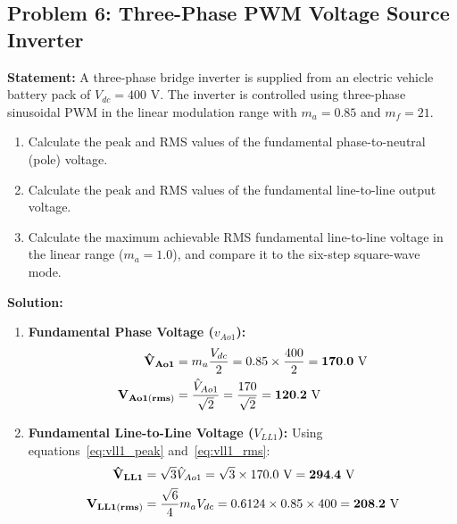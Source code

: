 \documentclass[11pt,a4paper]{article}
\let\origsubsection\subsection
\renewcommand{\subsection}{\Needspace{7\baselineskip}\origsubsection}
\begin{document}
\subsection{Problem 6: Three-Phase PWM Voltage Source Inverter}
\begin{examplebox}
\textbf{Statement:} A three-phase bridge inverter is supplied from an electric vehicle battery pack of $V_{dc} = 400\text{ V}$. The inverter is controlled using three-phase sinusoidal PWM in the linear modulation range with $m_a = 0.85$ and $m_f = 21$.
\begin{enumerate}
  \item Calculate the peak and RMS values of the fundamental phase-to-neutral (pole) voltage.
  \item Calculate the peak and RMS values of the fundamental line-to-line output voltage.
  \item Calculate the maximum achievable RMS fundamental line-to-line voltage in the linear range ($m_a = 1.0$), and compare it to the six-step square-wave mode.
\end{enumerate}

\tcblower
\textbf{Solution:}
\begin{enumerate}
  \item \textbf{Fundamental Phase Voltage ($v_{Ao1}$):}
  \begin{align*}
  \mathbf{\hat{V}_{Ao1}} &= m_a \frac{V_{dc}}{2} = 0.85 \times \frac{400}{2} = \mathbf{170.0\text{ V}} \notag\\
  \mathbf{V_{Ao1(rms)}} &= \frac{\hat{V}_{Ao1}}{\sqrt{2}} = \frac{170}{\sqrt{2}} = \mathbf{120.2\text{ V}}
  \end{align*}

  \item \textbf{Fundamental Line-to-Line Voltage ($V_{LL1}$):}
  Using equations~\eqref{eq:vll1_peak} and~\eqref{eq:vll1_rms}:
  \begin{align*}
  \mathbf{\hat{V}_{LL1}} &= \sqrt{3} \hat{V}_{Ao1} = \sqrt{3} \times 170.0\text{ V} = \mathbf{294.4\text{ V}} \notag\\
  \mathbf{V_{LL1(rms)}} &= \frac{\sqrt{6}}{4} m_a V_{dc} = 0.6124 \times 0.85 \times 400 = \mathbf{208.2\text{ V}}
  \end{align*}


\end{enumerate}
\end{examplebox}
\end{document}
